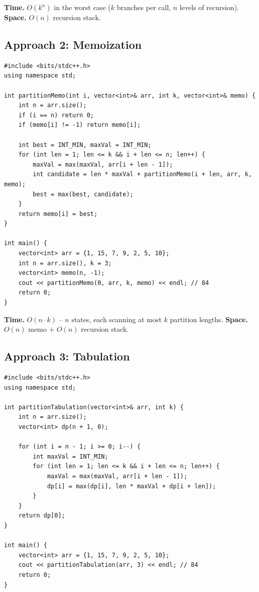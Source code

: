 \begin{complexitybox}
\textbf{Time.} $O(k^n)$ in the worst case ($k$ branches per call,
$n$ levels of recursion).
\textbf{Space.} $O(n)$ recursion stack.
\end{complexitybox}

\subsection*{Approach 2: Memoization}

\begin{lstlisting}
#include <bits/stdc++.h>
using namespace std;

int partitionMemo(int i, vector<int>& arr, int k, vector<int>& memo) {
    int n = arr.size();
    if (i == n) return 0;
    if (memo[i] != -1) return memo[i];

    int best = INT_MIN, maxVal = INT_MIN;
    for (int len = 1; len <= k && i + len <= n; len++) {
        maxVal = max(maxVal, arr[i + len - 1]);
        int candidate = len * maxVal + partitionMemo(i + len, arr, k, memo);
        best = max(best, candidate);
    }
    return memo[i] = best;
}

int main() {
    vector<int> arr = {1, 15, 7, 9, 2, 5, 10};
    int n = arr.size(), k = 3;
    vector<int> memo(n, -1);
    cout << partitionMemo(0, arr, k, memo) << endl; // 84
    return 0;
}
\end{lstlisting}

\begin{complexitybox}
\textbf{Time.} $O(n \cdot k)$ -- $n$ states, each scanning at most $k$
partition lengths.
\textbf{Space.} $O(n)$ memo $+$ $O(n)$ recursion stack.
\end{complexitybox}

\subsection*{Approach 3: Tabulation}

\begin{lstlisting}
#include <bits/stdc++.h>
using namespace std;

int partitionTabulation(vector<int>& arr, int k) {
    int n = arr.size();
    vector<int> dp(n + 1, 0);

    for (int i = n - 1; i >= 0; i--) {
        int maxVal = INT_MIN;
        for (int len = 1; len <= k && i + len <= n; len++) {
            maxVal = max(maxVal, arr[i + len - 1]);
            dp[i] = max(dp[i], len * maxVal + dp[i + len]);
        }
    }
    return dp[0];
}

int main() {
    vector<int> arr = {1, 15, 7, 9, 2, 5, 10};
    cout << partitionTabulation(arr, 3) << endl; // 84
    return 0;
}
\end{lstlisting}

